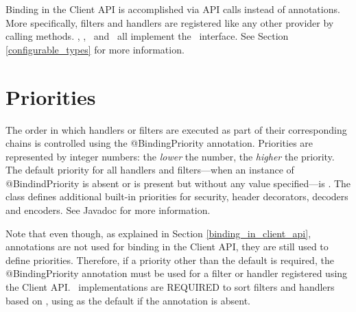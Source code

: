 Binding in the Client API is accomplished via API calls instead of annotations. More specifically, filters and handlers are registered like any other provider by calling  methods. \Client, \ClientConfiguration, \ResourceUri\ and \Invocation\ all implement the \Configurable\ interface. See Section \ref{configurable_types} for more information.

\section{Priorities}
\label{priorities}

The order in which handlers or filters are executed as part of their corresponding chains is controlled using the @BindingPriority annotation.
Priorities are represented by integer numbers: the \emph{lower} the number, the \emph{higher} the priority. The default priority for all handlers and filters---when an instance of @BindindPriority is absent or is present but without any value specified---is . The  class defines additional built-in priorities for security, header decorators, decoders and encoders. See Javadoc for more information.

Note that even though, as explained in Section \ref{binding_in_client_api}, annotations are not used for binding in the Client API, they are still used to define priorities. Therefore, if a priority other than the default is required, the @BindingPriority annotation must be used for a filter or handler registered using the Client API. \jaxrs\ implementations are REQUIRED to sort filters and handlers based on , using  as the default if the annotation is absent.




